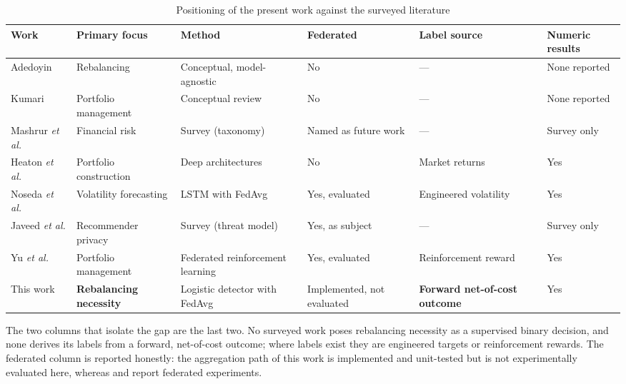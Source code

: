 \begin{table}[t]
\caption{Positioning of the present work against the surveyed literature}
\label{tab:t14}
\centering
\scriptsize
\setlength{\tabcolsep}{4pt}
\begin{tabular}{@{}llllll@{}}
\toprule
Work & Primary focus & Method & Federated & Label source & Numeric results \\
\midrule
Adedoyin \cite{adedoyin_ai} & Rebalancing & Conceptual, model-agnostic & No & --- & None reported \\
Kumari \cite{kumari2024} & Portfolio management & Conceptual review & No & --- & None reported \\
Mashrur \emph{et al.} \cite{mashrur2020} & Financial risk & Survey (taxonomy) & Named as future work & --- & Survey only \\
Heaton \emph{et al.} \cite{heaton2017} & Portfolio construction & Deep architectures & No & Market returns & Yes \\
Noseda \emph{et al.} \cite{noseda2025} & Volatility forecasting & LSTM with FedAvg & Yes, evaluated & Engineered volatility & Yes \\
Javeed \emph{et al.} \cite{javeed2024} & Recommender privacy & Survey (threat model) & Yes, as subject & --- & Survey only \\
Yu \emph{et al.} \cite{yu2022fedrl} & Portfolio management & Federated reinforcement learning & Yes, evaluated & Reinforcement reward & Yes \\
\midrule
This work & \textbf{Rebalancing necessity} & Logistic detector with FedAvg & Implemented, not evaluated
  & \textbf{Forward net-of-cost outcome} & Yes \\
\bottomrule
\end{tabular}

\vspace{0.5mm}
\raggedright\footnotesize
The two columns that isolate the gap are the last two. No surveyed work poses
rebalancing necessity as a supervised binary decision, and none derives its labels
from a forward, net-of-cost outcome; where labels exist they are engineered
targets or reinforcement rewards. The federated column is reported honestly: the
aggregation path of this work is implemented and unit-tested but is not
experimentally evaluated here, whereas \cite{noseda2025} and \cite{yu2022fedrl}
report federated experiments.
\end{table}
